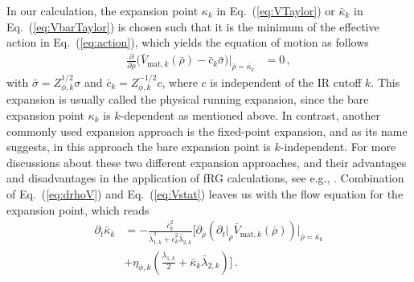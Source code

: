 \documentclass[%
reprint,
superscriptaddress,
showpacs,preprintnumbers,
amsmath,amssymb,
aps,
prd,
]{revtex4-1}
\def\Eq#1{Eq.~(\ref{#1})}
\begin{document}
	In our calculation, the expansion point $\kappa_k$ in \Eq{eq:VTaylor} or $\bar \kappa_k$ in \Eq{eq:VbarTaylor} is chosen such that it is the minimum of the effective action in \Eq{eq:action}, which yields the equation of motion as follows
	\begin{align}
		\frac{\partial}{\partial \bar \rho}\Big(\bar V_{\mathrm{mat}, k}(\bar \rho)-\bar c_k
		\bar \sigma \Big)\bigg \vert_{\bar\rho=\bar \kappa_k}&=0\,, \label{eq:Vstat}
	\end{align}
	with $ \bar \sigma=Z_{\phi,k}^{1/2} \sigma$ and $\bar c_k=Z_{\phi,k}^{-1/2} c$, where $c$ is independent of the IR cutoff $k$. This expansion is usually called the physical running expansion, since the bare expansion point $\kappa_k$ is $k$-dependent as mentioned above. In contrast, another commonly used expansion approach is the fixed-point expansion, and as its name suggests, in this approach the bare expansion point is $k$-independent. For more discussions about these two different expansion approaches, and their advantages and disadvantages in the application of fRG calculations, see e.g.,  \cite{Pawlowski:2014zaa,Braun:2014ata, Fu:2015naa, Rennecke:2016tkm,Yin:2019ebz}. Combination of \Eq{eq:drhoV} and \Eq{eq:Vstat} leaves us with the flow equation for the expansion point, which reads
	\begin{align}
		\partial_t \bar \kappa_k&=-\frac{\bar c_k^2}{\bar{\lambda}_{1,k}^3+\bar c_k^2\bar{\lambda}_{2,k}}\bigg[\partial_{\bar \rho}\left(\partial_t\big|_{\rho} \bar V_{\mathrm{mat}, k}(\bar \rho)\right)\Big|_{\bar \rho=\bar \kappa_k}\nonumber \\[2ex]
		&+\eta_{\phi,k}\left(\frac{\bar{\lambda}_{1,k}}{2}+\bar\kappa_k\bar{\lambda}_{2,k}\right)\bigg]\,.\label{eq:flowkappa}
	\end{align}
	
\end{document}
